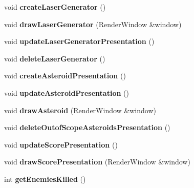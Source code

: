 \begin{DoxyCompactItemize}
void {\bfseries create\+Laser\+Generator} ()
\item 
\mbox{\label{class_game_presentation_a8c0ec310f4105564f11d1b48779e3941}} 
void {\bfseries draw\+Laser\+Generator} (Render\+Window \&window)
\item 
\mbox{\label{class_game_presentation_aa6d8e5e91de557ac2c39bb51e032f14f}} 
void {\bfseries update\+Laser\+Generator\+Presentation} ()
\item 
\mbox{\label{class_game_presentation_aebd299a3aa0c8e7a06d63f5cbc808c7d}} 
void {\bfseries delete\+Laser\+Generator} ()
\item 
\mbox{\label{class_game_presentation_a4c3e9bf3b8866eaff58c5eb8c83f3245}} 
void {\bfseries create\+Asteroid\+Presentation} ()
\item 
\mbox{\label{class_game_presentation_a669fe49aef6332f78a23802cafa6681c}} 
void {\bfseries update\+Asteroid\+Presentation} ()
\item 
\mbox{\label{class_game_presentation_adbeb1c114932cdab67120bd6fe6a5da5}} 
void {\bfseries draw\+Asteroid} (Render\+Window \&window)
\item 
\mbox{\label{class_game_presentation_acd19622d7ee0ae8b898f5805ae94f2b4}} 
void {\bfseries delete\+Outof\+Scope\+Asteroids\+Presentation} ()
\item 
\mbox{\label{class_game_presentation_ab2cf74842583bf5b63e5973fb8b657be}} 
void {\bfseries update\+Score\+Presentation} ()
\item 
\mbox{\label{class_game_presentation_a38bab53e3d75b244e14ed2d7c2710fa0}} 
void {\bfseries draw\+Score\+Presentation} (Render\+Window \&window)
\item 
\mbox{\label{class_game_presentation_ab09fbeaf4a3dfd753f1bce5cdd78969e}} 
int {\bfseries get\+Enemies\+Killed} ()
\item 
\mbox{\label{class_game_presentation_a903a8e09c19324b2380b5073abd570f0}} 

\end{DoxyCompactItemize}
